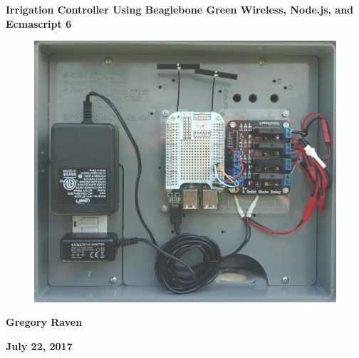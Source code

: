 %
%
%

\thispagestyle{empty}
{\centering\bfseries\color{black}\Huge
Irrigation Controller Using Beaglebone Green Wireless, Node.js, and Ecmascript 6
\par}

\bigskip

\begin{figure}
	\centering
	\includegraphics[width=\textwidth]{photos/cover_photo}
\end{figure}

\bigskip
{\centering\bfseries\Large
Gregory Raven
\par}


\bigskip
{\centering\bfseries\LARGE
July 22, 2017
\par}




